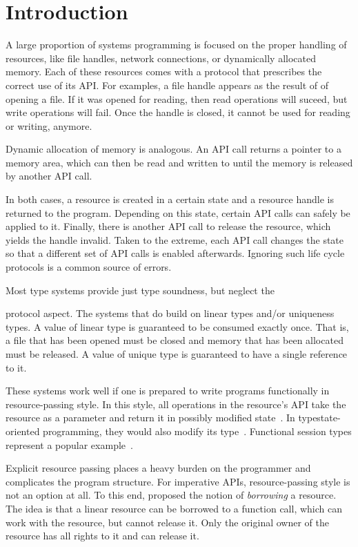 \section{Introduction}

A large proportion of systems programming is focused on the proper
handling of resources, like file handles, network connections, or
dynamically allocated memory. Each of these resources comes with a
protocol that prescribes the correct use of its API.
For examples, a file handle appears as the result of of opening a
file. If it was opened for reading, then read operations will suceed,
but write operations will fail. Once the handle is closed, it cannot
be used for reading or writing, anymore.

Dynamic allocation of memory is analogous. An API call returns a
pointer to a memory area, which can then be read and written to until
the memory is released by another API call.

In both cases, a resource is created in a certain state and a resource
handle is returned to the program. Depending on this state, certain API calls
can safely be applied to it. Finally, there is another API call to
release the resource, which yields the handle invalid.
Taken to the extreme, each API call changes the state so that a
different set of API calls is enabled afterwards. 
Ignoring such life cycle protocols is a common source of errors.


Most type systems provide just type soundness, but neglect the

protocol aspect. The systems that do build on linear types \cite{DBLP:journals/tcs/Girard87} and/or
uniqueness types\cite{DBLP:conf/plilp/BarendsenS95}. A value of linear
type is guaranteed to be consumed 
exactly once. That is, a file that has been opened must be closed and
memory that has been allocated must be released. A value of unique
type is guaranteed to have a single reference to it.

These systems work well if one is prepared to write programs
functionally in resource-passing style. In this style, all operations
in the resource's API take the resource as a parameter and return it
in possibly modified state~\cite{DBLP:journals/jfp/AchtenP95}. In
typestate-oriented programming, they would also modify its
type~\cite{DBLP:conf/oopsla/AldrichSSS09}. Functional session types 
represent a popular example~\cite{DBLP:journals/jfp/GayV10}. 

Explicit resource passing places a heavy burden on the programmer and
complicates the program structure. For imperative APIs,
resource-passing style is not an option at all. To this end,
\citet{DBLP:conf/popl/BoylandR05}  proposed the notion of
\emph{borrowing} a resource. The idea is that a linear resource can be
borrowed to a function call, which can work with the resource, but
cannot release it. Only the original owner of the resource has all
rights to it and can release it.

